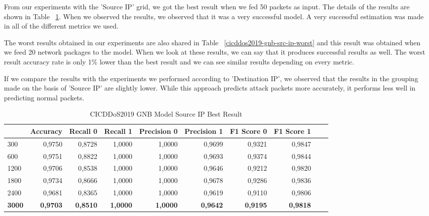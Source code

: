 \documentclass{article}
\begin{document}
From our experiments with the 'Source IP' grid, we got the best result when we fed 50 packets as input. The details of the results are shown in Table ~\ref{cicddos2019-gnb-src-ip-best}. When we observed the results, we observed that it was a very successful model. A very successful estimation was made in all of the different metrics we used.

The worst results obtained in our experiments are also shared in Table ~\ref{cicddos2019-gnb-src-ip-worst} and this result was obtained when we feed 20 network packages to the model. When we look at these results, we can say that it produces successful results as well. The worst result accuracy rate is only 1\% lower than the best result and we can see similar results depending on every metric.

If we compare the results with the experiments we performed according to 'Destination IP', we observed that the results in the grouping made on the basis of 'Source IP' are slightly lower. While this approach predicts attack packets more accurately, it performs less well in predicting normal packets.

\begin{table}
  \centering
  \caption{CICDDoS2019 GNB Model Source IP Best Result}
  \label{cicddos2019-gnb-src-ip-best}
  \begin{tabular}{lrrrrrrrrr}
    \toprule
	{ Pred Win & Accuracy & Recall 0 & Recall 1 & Precision 0 & Precision 1 & F1 Score 0 & F1 Score 1} \\
	\midrule
        300 & 0,9750 & 0,8728 & 1,0000 & 1,0000 & 0,9699 & 0,9321 & 0,9847 \\ \hline
        600 & 0,9751 & 0,8822 & 1,0000 & 1,0000 & 0,9693 & 0,9374 & 0,9844 \\ \hline
        1200 & 0,9706 & 0,8538 & 1,0000 & 1,0000 & 0,9646 & 0,9212 & 0,9820 \\ \hline
        1800 & 0,9734 & 0,8666 & 1,0000 & 1,0000 & 0,9678 & 0,9286 & 0,9836 \\ \hline
        2400 & 0,9681 & 0,8365 & 1,0000 & 1,0000 & 0,9619 & 0,9110 & 0,9806 \\ \hline
        \textbf{3000} & \textbf{0,9703} & \textbf{0,8510} & \textbf{1,0000} & \textbf{1,0000} & \textbf{0,9642} & \textbf{0,9195} & \textbf{0,9818} \\ 
	\bottomrule
  \end{tabular}
\end{table}
\end{document}
